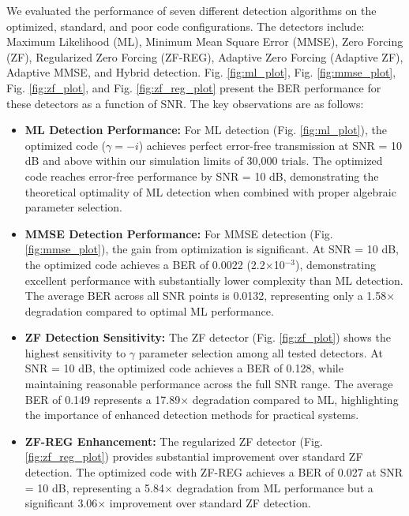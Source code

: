We evaluated the performance of seven different detection algorithms on the optimized, standard, and poor code configurations. The detectors include: Maximum Likelihood (ML), Minimum Mean Square Error (MMSE), Zero Forcing (ZF), Regularized Zero Forcing (ZF-REG), Adaptive Zero Forcing (Adaptive ZF), Adaptive MMSE, and Hybrid detection. Fig. \ref{fig:ml_plot}, Fig. \ref{fig:mmse_plot}, Fig. \ref{fig:zf_plot}, and Fig. \ref{fig:zf_reg_plot} present the BER performance for these detectors as a function of SNR. The key observations are as follows:
\begin{itemize}
    \item \textbf{ML Detection Performance:} For ML detection (Fig. \ref{fig:ml_plot}), the optimized code (\(\gamma = -i\)) achieves perfect error-free transmission at SNR = 10 dB and above within our simulation limits of 30,000 trials. The optimized code reaches error-free performance by SNR = 10 dB, demonstrating the theoretical optimality of ML detection when combined with proper algebraic parameter selection.
    
    \item \textbf{MMSE Detection Performance:} For MMSE detection (Fig. \ref{fig:mmse_plot}), the gain from optimization is significant. At SNR = 10 dB, the optimized code achieves a BER of 0.0022 (2.2$\times$10$^{-3}$), demonstrating excellent performance with substantially lower complexity than ML detection. The average BER across all SNR points is 0.0132, representing only a 1.58$\times$ degradation compared to optimal ML performance.
    
    \item \textbf{ZF Detection Sensitivity:} The ZF detector (Fig. \ref{fig:zf_plot}) shows the highest sensitivity to \(\gamma\) parameter selection among all tested detectors. At SNR = 10 dB, the optimized code achieves a BER of 0.128, while maintaining reasonable performance across the full SNR range. The average BER of 0.149 represents a 17.89$\times$ degradation compared to ML, highlighting the importance of enhanced detection methods for practical systems.
    
    \item \textbf{ZF-REG Enhancement:} The regularized ZF detector (Fig. \ref{fig:zf_reg_plot}) provides substantial improvement over standard ZF detection. The optimized code with ZF-REG achieves a BER of 0.027 at SNR = 10 dB, representing a 5.84$\times$ degradation from ML performance but a significant 3.06$\times$ improvement over standard ZF detection.
\end{itemize}

